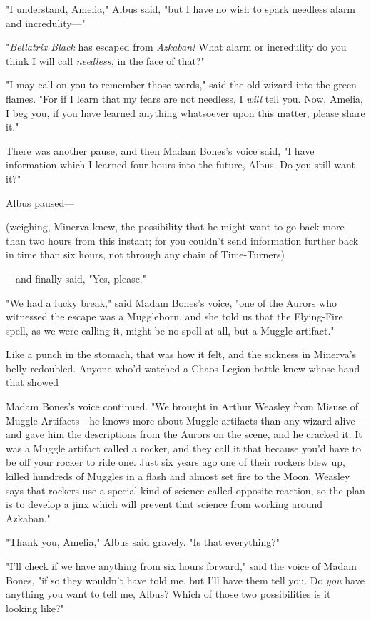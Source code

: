 "I understand, Amelia," Albus said, "but I have no wish to spark needless alarm
and incredulity---"

"\emph{Bellatrix Black} has escaped from \emph{Azkaban!} What alarm or
incredulity do you think I will call \emph{needless,} in the face of that?"

"I may call on you to remember those words," said the old wizard into the green
flames. "For if I learn that my fears are not needless, I \emph{will} tell you.
Now, Amelia, I beg you, if you have learned anything whatsoever upon this
matter, please share it."

There was another pause, and then Madam Bones's voice said, "I have information
which I learned four hours into the future, Albus. Do you still want it?"

Albus paused---

(weighing, Minerva knew, the possibility that he might want to go back more
than two hours from this instant; for you couldn't send information further
back in time than six hours, not through any chain of Time-Turners)

---and finally said, "Yes, please."

"We had a lucky break," said Madam Bones's voice, "one of the Aurors who
witnessed the escape was a Muggleborn, and she told us that the Flying-Fire
spell, as we were calling it, might be no spell at all, but a Muggle artifact."

Like a punch in the stomach, that was how it felt, and the sickness in
Minerva's belly redoubled. Anyone who'd watched a Chaos Legion battle knew
whose hand that showed{\el}

Madam Bones's voice continued. "We brought in Arthur Weasley from Misuse of
Muggle Artifacts---he knows more about Muggle artifacts than any wizard
alive---and gave him the descriptions from the Aurors on the scene, and he
cracked it. It was a Muggle artifact called a rocker, and they call it that
because you'd have to be off your rocker to ride one. Just six years ago one of
their rockers blew up, killed hundreds of Muggles in a flash and almost set
fire to the Moon. Weasley says that rockers use a special kind of science
called opposite reaction, so the plan is to develop a jinx which will prevent
that science from working around Azkaban."

"Thank you, Amelia," Albus said gravely. "Is that everything?"

"I'll check if we have anything from six hours forward," said the voice of
Madam Bones, "if so they wouldn't have told me, but I'll have them tell you. Do
\emph{you} have anything you want to tell me, Albus? Which of those two
possibilities is it looking like?"


